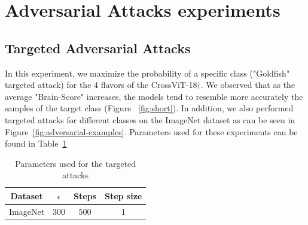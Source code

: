 \documentclass{article} %
\begin{document}
\section{Adversarial Attacks experiments}
\label{Adversarial-attacks-info}
\subsection{Targeted Adversarial Attacks}
In this experiment, we maximize the probability of a specific class ("Goldfish" targeted attack) for the 4 flavors of the CrossViT-18$\dagger$. We observed that as the average "Brain-Score" increases, the models tend to resemble more accurately the samples of the target class (Figure ~\ref{fig:short}). In addition, we also performed targeted attacks for different classes on the ImageNet dataset as can be seen in Figure~\ref{fig:adversarial-examples}. Parameters used for these experiments can be found in Table~\ref{table:parameters_targeted_attack}

\begin{table}[h!]
\centering
\begin{tabular}{cccc}\\\toprule  
Dataset & $\epsilon$ & Steps & Step size \\\midrule  
ImageNet & 300 & 500 & 1 \\ \bottomrule
\end{tabular}
 \vspace{4pt}
\caption{Parameters used for the targeted attacks}
\label{table:parameters_targeted_attack}
\end{table}
\end{document}
